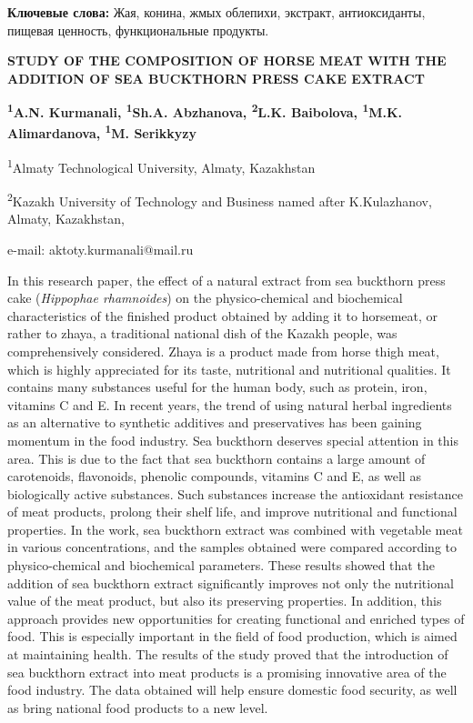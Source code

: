 {\bfseries Ключевые слова:} Жая, конина, жмых облепихи, экстракт,
антиоксиданты, пищевая ценность, функциональные продукты.

\begin{articleheader}
{\bfseries STUDY OF THE COMPOSITION OF HORSE MEAT WITH THE ADDITION OF SEA BUCKTHORN PRESS CAKE EXTRACT}

{\bfseries
\textsuperscript{1}A.N. Kurmanali\textsuperscript{\envelope },
\textsuperscript{1}Sh.A. Abzhanova,
\textsuperscript{2}L.K. Baibolova,
\textsuperscript{1}M.K. Alimardanova,
\textsuperscript{1}M. Serikkyzy
}
\end{articleheader}

\begin{affiliation}
\textsuperscript{1}Almaty Technological University, Almaty, Kazakhstan

\textsuperscript{2}Kazakh University of Technology and Business named after K.Kulazhanov, Almaty, Kazakhstan,

e-mail: aktoty.kurmanali@mail.ru
\end{affiliation}

In this research paper, the effect of a natural extract from sea
buckthorn press cake (\emph{Hippophae rhamno\-ides}) on the
physico-chemical and biochemical characteristics of the finished product
obtained by adding it to horsemeat, or rather to zhaya, a traditional
national dish of the Kazakh people, was comprehensively considered.
Zhaya is a product made from horse thigh meat, which is highly
appreciated for its taste, nutritional and nutritional qualities. It
contains many substances useful for the human body, such as protein,
iron, vitamins C and E. In recent years, the trend of using natural
herbal ingredients as an alternative to synthetic additives and
preservatives has been gaining momentum in the food industry. Sea
buckthorn deserves special attention in this area. This is due to the
fact that sea buckthorn contains a large amount of carotenoids,
flavonoids, phenolic compounds, vitamins C and E, as well as
biologically active substances. Such substances increase the antioxidant
resistance of meat products, prolong their shelf life, and improve
nutritional and functional properties. In the work, sea buckthorn
extract was combined with vegetable meat in various concentrations, and
the samples obtained were compared according to physico-chemical and
biochemical parameters. These results showed that the addition of sea
buckthorn extract significantly improves not only the nutritional value
of the meat product, but also its preserving properties. In addition,
this approach provides new opportunities for creating functional and
enriched types of food. This is especially important in the field of
food production, which is aimed at maintaining health. The results of
the study proved that the introduction of sea buckthorn extract into
meat products is a promising innovative area of the food industry. The
data obtained will help ensure domestic food security, as well as bring
national food products to a new level.

